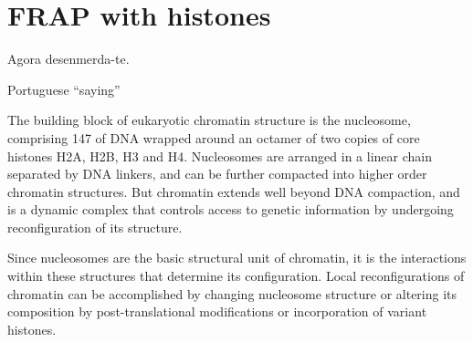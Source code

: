 \chapter{FRAP with histones}
\label{ch:frap}

\epigraph{Agora desenmerda-te.}{Portuguese ``saying''}



\noindent
The building block of eukaryotic chromatin structure is the nucleosome, comprising
\SI{147}{\bp} of DNA wrapped around an octamer of two copies of core histones H2A,
H2B, H3 and H4. Nucleosomes are arranged in a linear chain separated by DNA linkers, and
can be further compacted into higher order chromatin structures. But chromatin extends
well beyond DNA compaction, and is a dynamic complex that controls access to genetic
information by undergoing reconfiguration of its structure.

Since nucleosomes are the basic structural unit of chromatin, it is the interactions
within these structures that determine its configuration. Local
reconfigurations of chromatin can be accomplished by changing nucleosome structure or altering
its composition by post-translational modifications or incorporation of variant
histones.

